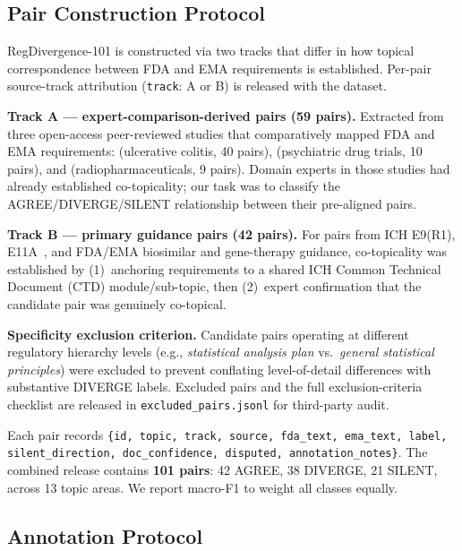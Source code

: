 \documentclass[manuscript]{acmart}
\begin{document}
\subsection{Pair Construction Protocol}
\label{sec:dataset}

\begin{revblock}
RegDivergence-101 is constructed via two tracks that differ in how topical
correspondence between FDA and EMA requirements is established. Per-pair
source-track attribution (\texttt{track}: A or B) is released with the dataset.

\textbf{Track A --- expert-comparison-derived pairs (59 pairs).}
Extracted from three open-access peer-reviewed studies that comparatively mapped
FDA and EMA requirements: \citet{uc2025jcc} (ulcerative colitis, 40 pairs),
\citet{pmc8157504} (psychiatric drug trials, 10 pairs), and
\citet{pmc6529498} (radiopharmaceuticals, 9 pairs). Domain experts in those
studies had already established co-topicality; our task was to classify the
AGREE/DIVERGE/SILENT relationship between their pre-aligned pairs.

\textbf{Track B --- primary guidance pairs (42 pairs).}
For pairs from ICH E9(R1), E11A~\cite{iche11a2024}, and FDA/EMA biosimilar and
gene-therapy guidance, co-topicality was established by (1)~anchoring
requirements to a shared ICH Common Technical Document (CTD) module/sub-topic,
then (2)~expert confirmation that the candidate pair was genuinely co-topical.

\textbf{Specificity exclusion criterion.}
Candidate pairs operating at different regulatory hierarchy levels (e.g.,
\textit{statistical analysis plan} vs.\ \textit{general statistical principles})
were excluded to prevent conflating level-of-detail differences with substantive
DIVERGE labels. Excluded pairs and the full exclusion-criteria checklist are
released in \texttt{excluded\_pairs.jsonl} for third-party audit.

Each pair records
\texttt{\{id, topic, track, source, fda\_text, ema\_text, label,
silent\_direction, doc\_confidence, disputed, annotation\_notes\}}.
The combined release contains \textbf{101 pairs}: 42 AGREE, 38 DIVERGE, 21
SILENT, across 13 topic areas. We report macro-F1 to weight all classes equally.
\end{revblock}

\subsection{Annotation Protocol}
\label{sec:annotation}
\end{document}
